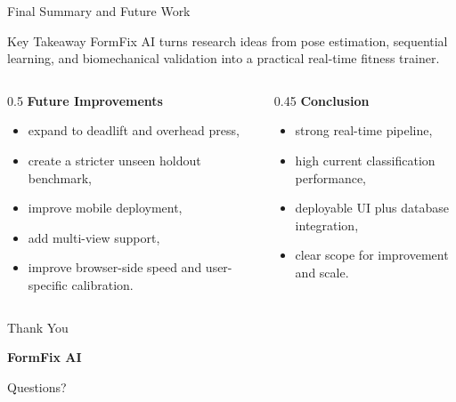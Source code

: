 \documentclass[aspectratio=169]{beamer}
\begin{document}
\begin{frame}{Final Summary and Future Work}
    \begin{block}{Key Takeaway}
        FormFix AI turns research ideas from pose estimation, sequential learning, and biomechanical validation into a practical real-time fitness trainer.
    \end{block}

    \begin{columns}[T]
        \begin{column}{0.5\textwidth}
            \textbf{Future Improvements}
            \begin{itemize}
                \item expand to deadlift and overhead press,
                \item create a stricter unseen holdout benchmark,
                \item improve mobile deployment,
                \item add multi-view support,
                \item improve browser-side speed and user-specific calibration.
            \end{itemize}
        \end{column}
        \begin{column}{0.45\textwidth}
            \textbf{Conclusion}
            \begin{itemize}
                \item strong real-time pipeline,
                \item high current classification performance,
                \item deployable UI plus database integration,
                \item clear scope for improvement and scale.
            \end{itemize}
        \end{column}
    \end{columns}
\end{frame}

\begin{frame}
    \centering
    \Huge \textcolor{FormFixBlue}{Thank You}

    \vspace{0.4cm}
    \Large \textbf{FormFix AI}

    \vspace{0.2cm}
    \small Questions?
\end{frame}
\end{document}
